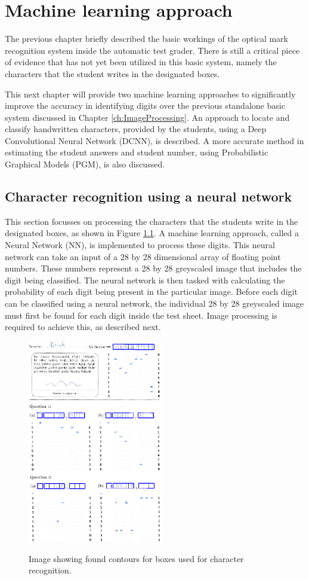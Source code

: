 \chapter{Machine learning approach}
\label{ch:MachineLearning}
\graphicspath{{Chapter4/Chapter4Figures/}}

The previous chapter briefly described the basic workings of the optical mark recognition system inside the automatic test grader. There is still a critical piece of evidence that has not yet been utilized in this basic system, namely the characters that the student writes in the designated boxes.

This next chapter will provide two machine learning approaches to significantly improve the accuracy in identifying digits over the previous standalone basic system discussed in Chapter \ref{ch:ImageProcessing}. An approach to locate and classify handwritten characters, provided by the students, using a Deep Convolutional Neural Network (DCNN), is described. A more accurate method in estimating the  student answers and student number, using Probabilistic  Graphical Models (PGM), is also discussed. 

\section{Character recognition using a neural network}

This section focusses on processing the characters that the students write in the designated boxes, as shown in Figure \ref{fig:sa}. A machine learning approach, called a Neural Network (NN), is implemented to process these digits. This neural network can take an input of a 28 by 28 dimensional array of floating point numbers. These numbers represent a 28 by 28 greyscaled image that includes the digit being classified. The neural network is then tasked with calculating the probability of each digit being present in the particular image. Before each digit can be classified using a neural network, the individual 28 by 28 greyscaled image must first be found for each digit inside the test sheet. Image processing is required to achieve this, as described next.
\begin{figure}
  \centering
  \includegraphics[width=5.9cm]{DigitScan}\\
  \caption{Image showing found contours for boxes used for character recognition.}
  \label{fig:sa}
\end{figure}

